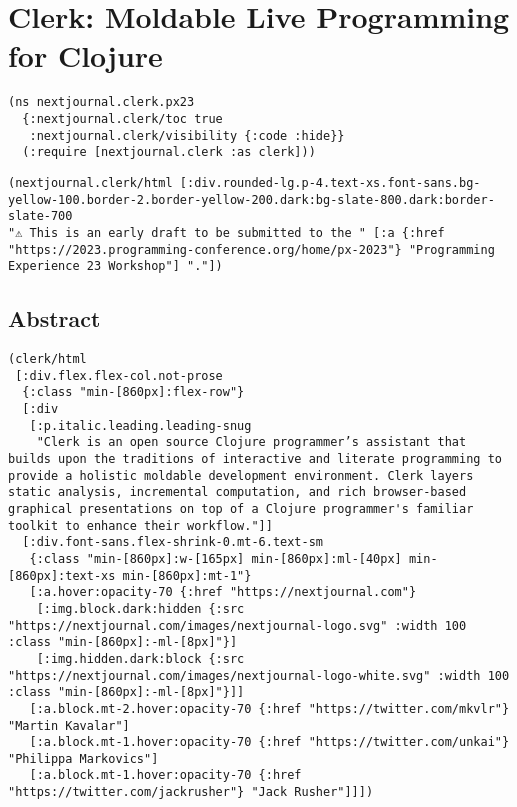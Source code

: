 \documentclass[
]{article}
\author{}
\date{}
\begin{document}
\hypertarget{id}{%
\section{Clerk: Moldable Live Programming for Clojure}\label{id}}

\begin{lstlisting}
(ns nextjournal.clerk.px23
  {:nextjournal.clerk/toc true
   :nextjournal.clerk/visibility {:code :hide}}
  (:require [nextjournal.clerk :as clerk]))
\end{lstlisting}

\begin{lstlisting}
(nextjournal.clerk/html [:div.rounded-lg.p-4.text-xs.font-sans.bg-yellow-100.border-2.border-yellow-200.dark:bg-slate-800.dark:border-slate-700
"⚠️ This is an early draft to be submitted to the " [:a {:href "https://2023.programming-conference.org/home/px-2023"} "Programming Experience 23 Workshop"] "."])
\end{lstlisting}

\hypertarget{id}{%
\subsection{Abstract}\label{id}}

\begin{lstlisting}
(clerk/html
 [:div.flex.flex-col.not-prose
  {:class "min-[860px]:flex-row"}
  [:div
   [:p.italic.leading.leading-snug
    "Clerk is an open source Clojure programmer’s assistant that builds upon the traditions of interactive and literate programming to provide a holistic moldable development environment. Clerk layers static analysis, incremental computation, and rich browser-based graphical presentations on top of a Clojure programmer's familiar toolkit to enhance their workflow."]]
  [:div.font-sans.flex-shrink-0.mt-6.text-sm
   {:class "min-[860px]:w-[165px] min-[860px]:ml-[40px] min-[860px]:text-xs min-[860px]:mt-1"}
   [:a.hover:opacity-70 {:href "https://nextjournal.com"}
    [:img.block.dark:hidden {:src "https://nextjournal.com/images/nextjournal-logo.svg" :width 100 :class "min-[860px]:-ml-[8px]"}]
    [:img.hidden.dark:block {:src "https://nextjournal.com/images/nextjournal-logo-white.svg" :width 100 :class "min-[860px]:-ml-[8px]"}]]
   [:a.block.mt-2.hover:opacity-70 {:href "https://twitter.com/mkvlr"} "Martin Kavalar"]
   [:a.block.mt-1.hover:opacity-70 {:href "https://twitter.com/unkai"} "Philippa Markovics"]
   [:a.block.mt-1.hover:opacity-70 {:href "https://twitter.com/jackrusher"} "Jack Rusher"]]])
\end{lstlisting}
\end{document}
